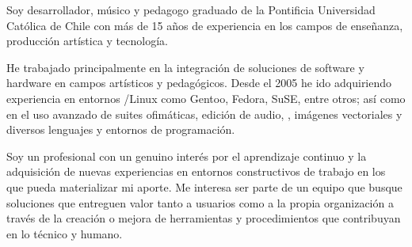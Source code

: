 

\begin{cvparagraph}

Soy desarrollador, músico y pedagogo graduado de la Pontificia Universidad
Católica de Chile con más de 15 años de experiencia en los campos de enseñanza,
producción artística y tecnología.

He trabajado principalmente en la integración de soluciones de software y
hardware en campos artísticos y pedagógicos. Desde el 2005 he ido adquiriendo
experiencia en entornos /Linux como Gentoo, Fedora, SuSE, entre otros;
así como en el uso avanzado de suites ofimáticas, edición de audio, ,
imágenes vectoriales y diversos lenguajes y entornos de programación.

Soy un profesional con un genuino interés por el aprendizaje continuo y la
adquisición de nuevas experiencias en entornos constructivos de trabajo en los
que pueda materializar mi aporte. Me interesa ser parte de un equipo que busque
soluciones que entreguen valor tanto a usuarios como a la propia organización a
través de la creación o mejora de herramientas y procedimientos que contribuyan
en lo técnico y humano.

\end{cvparagraph}

